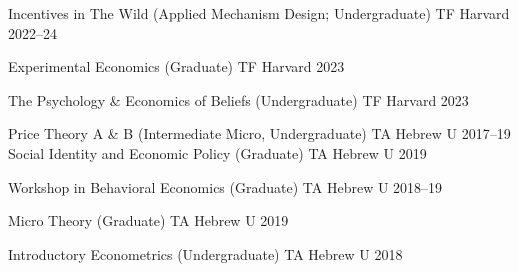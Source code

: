 


\begin{cvhonors}
% 


  \cvhonor
    {Incentives in The Wild (Applied Mechanism Design; Undergraduate)} %
    {TF} %
    {Harvard} %
    {2022--24} %

  
  \cvhonor
    {Experimental Economics (Graduate)} %
    {TF} %
    {Harvard} %
    {2023} %

    \cvhonor
    {The Psychology \& Economics of Beliefs
 (Undergraduate)} %
    {TF} %
    {Harvard} %
    {2023} %
 



  \cvhonor
    {Price Theory A \& B (Intermediate Micro, Undergraduate)} %
    {TA} %
    {Hebrew U} %
    {2017--19} %
  \cvhonor
    {Social Identity and Economic Policy (Graduate)} %
    {TA} %
    {Hebrew U} %
    {2019} %

  \cvhonor
    {Workshop in Behavioral Economics (Graduate)} %
    {TA} %
    {Hebrew U} %
    {2018--19} %

  \cvhonor
    {Micro Theory (Graduate)} %
    {TA} %
    {Hebrew U} %
    {2019} %


  \cvhonor
    {Introductory Econometrics (Undergraduate)} %
    {TA} %
    {Hebrew U} %
    {2018} %





\end{cvhonors}
